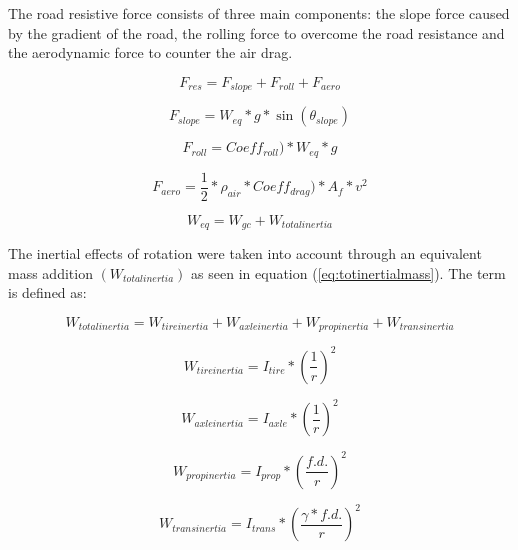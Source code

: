 \documentclass[MastersThesis.tex]{subfiles}
\begin{document}
The road resistive force consists of three main components: the slope force caused by the gradient of the road, the rolling force to overcome the road resistance and the aerodynamic force to counter the air drag.

\begin{equation} \label{eq:roadresforce}
F_{res}=F_{slope} + F_{roll} + F_{aero}
\end{equation}

\begin{equation} \label{eq:slopeforce}
F_{slope}=W_{eq}* g * \sin(\theta_{slope})
\end{equation}

\begin{equation} \label{eq:rollingforce}
F_{roll} =Coeff_{roll})* W_{eq} * g
\end{equation}

\begin{equation} \label{eq:aeroforce}
F_{aero}= \frac{1}{2} * \rho_{air}*Coeff_{drag})* A_f * v^2
\end{equation}

\begin{equation} \label{eq:rollingforce}
W_{eq} =W_{gc}+W_{total inertia}
\end{equation}

The inertial effects of rotation were taken into account through an equivalent mass addition $(W_{total inertia})$ as seen in equation (\ref{eq:totinertialmass}). The term is defined as: 

\begin{equation} \label{eq:totinertialmass}
W_{total inertia}  = W_{tire inertia} +W_{axle inertia}+W_{prop inertia}+W_{trans inertia}
\end{equation}

\begin{equation} \label{eq:tireinertia}
W_{tire inertia} =I_{tire}*(\frac{1}{r})^2
\end{equation}

\begin{equation} \label{eq:axleinertia}
W_{axle inertia} =I_{axle}*(\frac1r)^2
\end{equation}

\begin{equation} \label{eq:propinertia}
W_{prop inertia} =I_{prop}*(\frac{f.d.}{r})^2
\end{equation}

\begin{equation} \label{eq:transinertia}
W_{trans inertia} =I_{trans}*(\frac{\gamma*f.d.}{r})^2
\end{equation}
\end{document}
